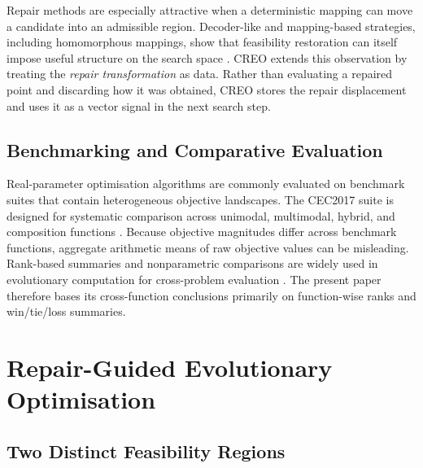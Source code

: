 \documentclass[a4paper,fleqn]{cas-sc}
\begin{document}
Repair methods are especially attractive when a deterministic mapping can move a candidate into an admissible region. Decoder-like and mapping-based strategies, including homomorphous mappings, show that feasibility restoration can itself impose useful structure on the search space \cite{koziel1999homomorphous}. CREO extends this observation by treating the \emph{repair transformation} as data. Rather than evaluating a repaired point and discarding how it was obtained, CREO stores the repair displacement and uses it as a vector signal in the next search step.

\subsection{Benchmarking and Comparative Evaluation}

Real-parameter optimisation algorithms are commonly evaluated on benchmark suites that contain heterogeneous objective landscapes. The CEC2017 suite is designed for systematic comparison across unimodal, multimodal, hybrid, and composition functions \cite{awad2017cec}. Because objective magnitudes differ across benchmark functions, aggregate arithmetic means of raw objective values can be misleading. Rank-based summaries and nonparametric comparisons are widely used in evolutionary computation for cross-problem evaluation \cite{garcia2009nonparametric,derrac2011tutorial}. The present paper therefore bases its cross-function conclusions primarily on function-wise ranks and win/tie/loss summaries.

\section{Repair-Guided Evolutionary Optimisation}
\label{sec:method}

\subsection{Two Distinct Feasibility Regions}
\end{document}
